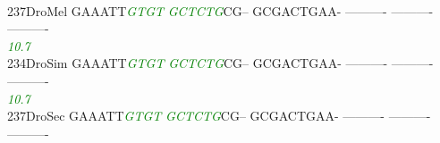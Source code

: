 \documentclass[11pt,twoside,reqno,a4paper]{article}
\begin{document}
{\\
237\hspace*{1\charwidth}DroMel	GAAATT\textit{\textcolor{green}{G}}\textit{\textcolor{green}{T}}\textit{\textcolor{green}{G}}\textit{\textcolor{green}{T}}	\textit{\textcolor{green}{G}}\textit{\textcolor{green}{C}}\textit{\textcolor{green}{T}}\textit{\textcolor{green}{C}}\textit{\textcolor{green}{T}}\textit{\textcolor{green}{G}}CG--	GCGACTGAA-	----------	----------	----------	\\
\hspace*{4\charwidth}\hspace*{7\charwidth}\hspace*{6\charwidth}\textit{\textcolor{green}{10.7}}\hspace*{1\charwidth}\hspace*{1\charwidth}\hspace*{1\charwidth}\hspace*{1\charwidth}\hspace*{1\charwidth}\hspace*{1\charwidth}\\
234\hspace*{1\charwidth}DroSim	GAAATT\textit{\textcolor{green}{G}}\textit{\textcolor{green}{T}}\textit{\textcolor{green}{G}}\textit{\textcolor{green}{T}}	\textit{\textcolor{green}{G}}\textit{\textcolor{green}{C}}\textit{\textcolor{green}{T}}\textit{\textcolor{green}{C}}\textit{\textcolor{green}{T}}\textit{\textcolor{green}{G}}CG--	GCGACTGAA-	----------	----------	----------	\\
\hspace*{4\charwidth}\hspace*{7\charwidth}\hspace*{6\charwidth}\textit{\textcolor{green}{10.7}}\hspace*{1\charwidth}\hspace*{1\charwidth}\hspace*{1\charwidth}\hspace*{1\charwidth}\hspace*{1\charwidth}\hspace*{1\charwidth}\\
237\hspace*{1\charwidth}DroSec	GAAATT\textit{\textcolor{green}{G}}\textit{\textcolor{green}{T}}\textit{\textcolor{green}{G}}\textit{\textcolor{green}{T}}	\textit{\textcolor{green}{G}}\textit{\textcolor{green}{C}}\textit{\textcolor{green}{T}}\textit{\textcolor{green}{C}}\textit{\textcolor{green}{T}}\textit{\textcolor{green}{G}}CG--	GCGACTGAA-	----------	----------	----------	\\
}
\end{document}
